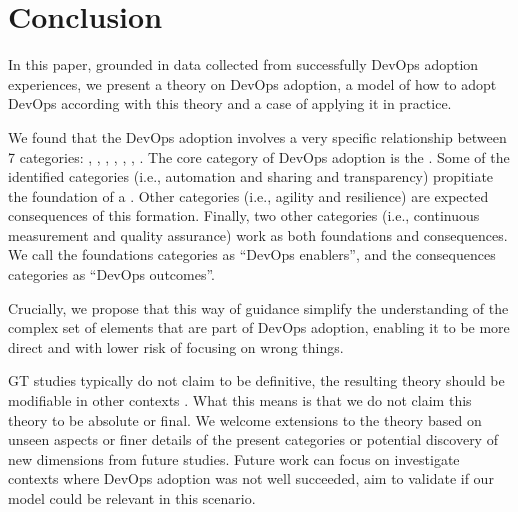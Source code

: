 \section{Conclusion} \label{sec:conclusion}

In this paper, grounded in data collected from successfully DevOps adoption
experiences, we present a theory on DevOps adoption, a model of how to adopt
DevOps according with this theory and a case of applying it in practice.

We found that the DevOps adoption involves a very specific relationship between
7 categories: , , \cc, , , , .
The core category of DevOps adoption is the \cc. Some of the
identified categories (i.e., automation and sharing and transparency) propitiate
the foundation of a \cc. Other categories
(i.e., agility and resilience) are expected consequences of this formation.
Finally, two other categories (i.e., continuous measurement and quality
assurance) work as both foundations and consequences. We call the foundations
categories as ``DevOps enablers'', and the consequences categories as ``DevOps outcomes''.

Crucially, we propose that this way of guidance simplify the understanding of the
complex set of elements that are part of DevOps adoption, enabling it to be
more direct and with lower risk of focusing on wrong things.

GT studies typically do not claim to be definitive, the resulting theory should
be modifiable in other contexts \cite{hoda2012developing}. What this means is that we do not claim
this theory to be absolute or final. We welcome extensions to the theory based
on unseen aspects or finer details of the present categories or potential discovery
of new dimensions from future studies. Future work can focus on investigate contexts
where DevOps adoption was not well succeeded, aim to validate if our model could be
relevant in this scenario.

